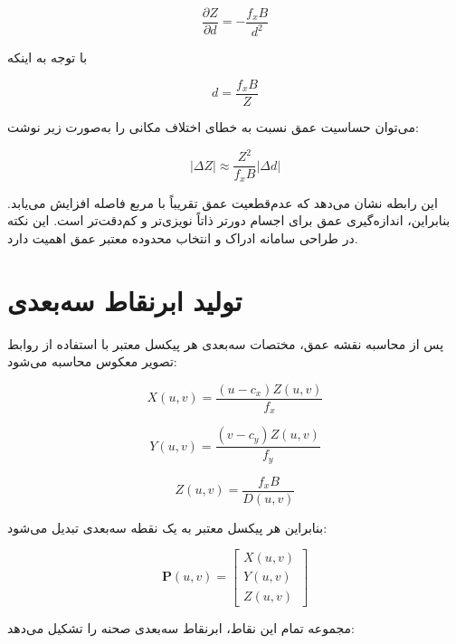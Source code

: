 \begin{equation}
	\frac{\partial Z}{\partial d}
	=
	-\frac{f_x B}{d^2}
	\label{eq:depth_derivative_disparity}
\end{equation}

با توجه به اینکه

\begin{equation}
	d =
	\frac{f_xB}{Z}
\end{equation}

می‌توان حساسیت عمق نسبت به خطای اختلاف مکانی را به‌صورت زیر نوشت:

\begin{equation}
	|\Delta Z|
	\approx
	\frac{Z^2}{f_xB}
	|\Delta d|
	\label{eq:depth_uncertainty}
\end{equation}

این رابطه نشان می‌دهد که عدم‌قطعیت عمق تقریباً با مربع فاصله افزایش می‌یابد. بنابراین، اندازه‌گیری عمق برای اجسام دورتر ذاتاً نویزی‌تر و کم‌دقت‌تر است. این نکته در طراحی سامانه ادراک و انتخاب محدوده معتبر عمق اهمیت دارد.

\section{تولید ابرنقاط سه‌بعدی}

پس از محاسبه نقشه عمق، مختصات سه‌بعدی هر پیکسل معتبر با استفاده از روابط تصویر معکوس محاسبه می‌شود:

\begin{equation}
	X(u,v)
	=
	\frac{(u-c_x)Z(u,v)}{f_x}
\end{equation}

\begin{equation}
	Y(u,v)
	=
	\frac{(v-c_y)Z(u,v)}{f_y}
\end{equation}

\begin{equation}
	Z(u,v)
	=
	\frac{f_xB}{D(u,v)}
\end{equation}

بنابراین هر پیکسل معتبر به یک نقطه سه‌بعدی تبدیل می‌شود:

\begin{equation}
	\mathbf{P}(u,v)
	=
	\begin{bmatrix}
		X(u,v) \\
		Y(u,v) \\
		Z(u,v)
	\end{bmatrix}
\end{equation}

مجموعه تمام این نقاط، ابرنقاط سه‌بعدی صحنه را تشکیل می‌دهد:

